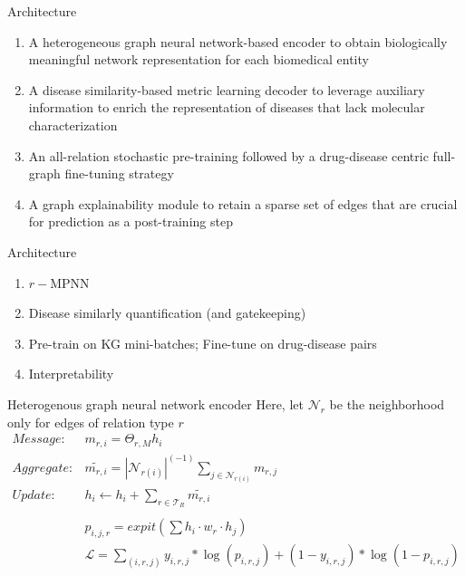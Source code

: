 \documentclass{beamer}
\newcommand{\nhood}{\mathcal{N}}
\newcommand{\nrepresent}{h}
\newcommand{\Loss}{\mathcal{L}}
\newcommand{\relation}{r}
\newcommand{\RelationSet}{\mathcal{T}_R}
\begin{document}
\begin{frame}{Architecture}
    \begin{enumerate}
        \item A heterogeneous graph neural network-based encoder to obtain biologically meaningful network representation for each biomedical entity
        \item A disease similarity-based metric learning decoder to leverage auxiliary information to enrich the representation of diseases that lack molecular characterization
        \item An all-relation stochastic pre-training followed by a drug-disease centric full-graph fine-tuning strategy
        \item A graph explainability module to retain a sparse set of edges that are crucial for prediction as a post-training step
      \end{enumerate}
\end{frame}

\begin{frame}{Architecture}
    \begin{enumerate}
        \item $\relation-$MPNN
        \item Disease similarly quantification (and gatekeeping)
        \item Pre-train on KG mini-batches; Fine-tune on drug-disease pairs 
        \item Interpretability 
      \end{enumerate}
\end{frame}

\begin{frame}{Heterogenous graph neural network encoder}
    Here, let $\nhood_\relation$ be the neighborhood only for edges of relation type $r$
    \begin{align*}
        Message:
        &
        m_{\relation,i} 
        = 
        \Theta_{\relation,M}\nrepresent_i
        \\
        Aggregate:
        &
        \widetilde{m_{\relation,i}} 
        = 
        |\nhood_{\relation (i)}|^{(-1)}
        \sum_{j \in \nhood_{\relation (i)}}
        m_{\relation,j}
        \\
        Update:
        &
        h_i 
        \leftarrow 
        h_i + \sum_{\relation \in \RelationSet}
        \widetilde{m_{\relation,i}} 
        \\
        \\
        &p_{i,j,r} 
        =
        expit(\sum \nrepresent_i \cdot w_r \cdot \nrepresent_j)
        \\
        &
        \Loss 
        =
        \sum_{(i,r,j)}
        y_{i,r,j} * \log(p_{i,r,j})
        +
        (1-y_{i,r,j}) * \log(1-p_{i,r,j})
    \end{align*}
\end{frame}
\end{document}
